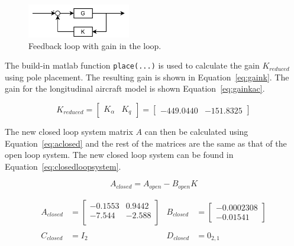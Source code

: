 \begin{figure}[ht]
    \centering
    \includegraphics[width=0.4\textwidth]{figures/pc_loop1.pdf}    
    \caption{Feedback loop with gain in the loop.}
    \label{fig:pc_loop1}
\end{figure}

The build-in matlab function \texttt{place(...)} is used to calculate the gain $K_{reduced}$ using pole placement. The resulting gain is shown in Equation~\ref{eq:gaink}. The gain for the longitudinal aircraft model is shown Equation~\ref{eq:gainkac}.

\begin{equation}
    \label{eq:gaink}
    K_{reduced}=\begin{bmatrix}
                    K_{\alpha} & K_q
                \end{bmatrix}
               =\begin{bmatrix}
                    -449.0440 & -151.8325
                \end{bmatrix}
\end{equation}

The new closed loop system matrix $A$ can then be calculated using Equation~\ref{eq:aclosed} and the rest of the matrices are the same as that of the open loop system. The new closed loop system can be found in Equation~\ref{eq:closedloopsystem}.

\begin{equation}
    \label{eq:aclosed}
    A_{closed} = A_{open}-B_{open}K
\end{equation}


\begin{equation}
    \label{eq:closedloopsystem}
    \begin{aligned}
        A_{closed}&=\begin{bmatrix}
            -0.1553 &  0.9442 \\
            -7.544  & -2.588 \\
        \end{bmatrix} &
        B_{closed}&=\begin{bmatrix}
            -0.0002308 \\
            -0.01541
        \end{bmatrix} \\\\
        C_{closed}&=I_2 &
        D_{closed}&=0_{2,1}
    \end{aligned}
\end{equation}


